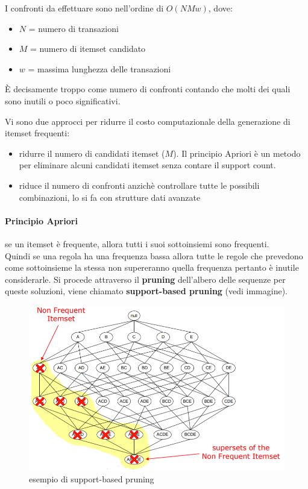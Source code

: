 I confronti da effettuare sono nell'ordine di $O(NMw)$, dove:
\begin{itemize}
	\item $N$ = numero di transazioni
	\item $M$ = numero di itemset candidato
	\item $w$ = massima lunghezza delle transazioni
\end{itemize} 

È decisamente troppo come numero di confronti contando che molti dei quali sono inutili o poco significativi.

Vi sono due approcci per ridurre il costo computazionale della generazione di itemset frequenti:
\begin{itemize}
	\item ridurre il numero di candidati itemset ($M$). Il principio Apriori \`e un metodo per eliminare alcuni candidati itemset senza contare il support count. 
	\item riduce il numero di confronti anzich\`e controllare tutte le possibili combinazioni, lo si fa con strutture dati avanzate
\end{itemize}

\paragraph{Principio Apriori} se un itemset \`e frequente, allora tutti i suoi sottoinsiemi sono frequenti.\\
Quindi se una regola ha una frequenza bassa allora tutte le regole che prevedono come sottoinsieme la stessa non supereranno quella frequenza pertanto \`e inutile considerarle. Si procede attraverso il \textbf{pruning} dell'albero delle sequenze per queste soluzioni, viene chiamato \textbf{support-based pruning} (vedi immagine).

\begin{figure}[H]
	\centering
	\includegraphics[height=0.5 \linewidth]{association/pict/pruning.png}
	\caption{esempio di support-based pruning}
\end{figure}

